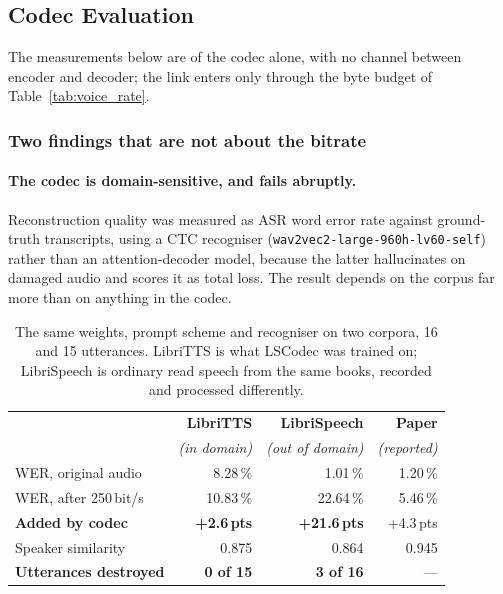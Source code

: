 \subsection{Codec Evaluation}
\label{sec:voice_eval}

The measurements below are of the codec alone, with no channel between
encoder and decoder; the link enters only through the byte budget of
Table~\ref{tab:voice_rate}.

\subsubsection{Two findings that are not about the bitrate}

\paragraph{The codec is domain-sensitive, and fails abruptly.}
Reconstruction quality was measured as ASR word error rate against
ground-truth transcripts, using a CTC recogniser
(\texttt{wav2vec2-large-960h-lv60-self}) rather than an
attention-decoder model, because the latter hallucinates on damaged
audio and scores it as total loss.  The result depends on the corpus
far more than on anything in the codec.

\begin{table}[H]
    \centering
    \caption{The same weights, prompt scheme and recogniser on two
             corpora, 16 and 15 utterances.  LibriTTS is what LSCodec
             was trained on; LibriSpeech is ordinary read speech from
             the same books, recorded and processed differently.}
    \label{tab:voice_domain}
    \small
    \begin{tabular}{@{}lrrr@{}}
    \toprule
    & \textbf{LibriTTS} & \textbf{LibriSpeech} & \textbf{Paper} \\
    & \emph{(in domain)} & \emph{(out of domain)} & \emph{(reported)} \\
    \midrule
    WER, original audio      & 8.28\,\% & 1.01\,\%  & 1.20\,\% \\
    WER, after 250\,bit/s    & 10.83\,\% & 22.64\,\% & 5.46\,\% \\
    \textbf{Added by codec}  & \textbf{+2.6\,pts} & \textbf{+21.6\,pts}
                             & +4.3\,pts \\
    Speaker similarity       & 0.875 & 0.864 & 0.945 \\
    \textbf{Utterances destroyed} & \textbf{0 of 15} & \textbf{3 of 16}
                             & --- \\
    \bottomrule
    \end{tabular}
\end{table}

